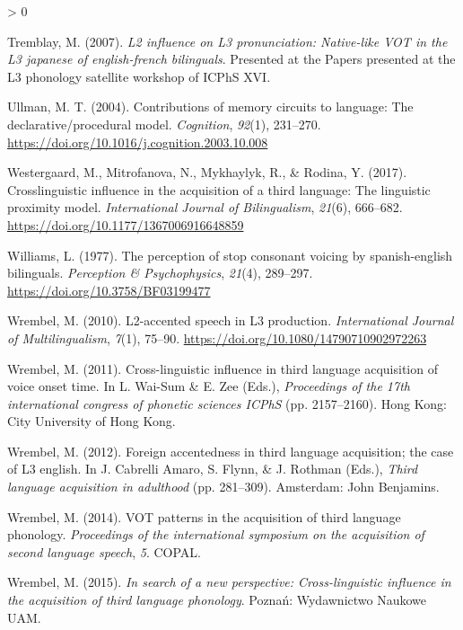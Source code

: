 \documentclass[
  english,
  man]{apa6}
\newlength{\cslhangindent}
\newenvironment{CSLReferences}[2] %
 {%
  \setlength{\parindent}{0pt}
  \ifodd #1 \everypar{\setlength{\hangindent}{\cslhangindent}}\ignorespaces\fi
  \ifnum #2 > 0
  \setlength{\parskip}{#2\baselineskip}
  \fi
 }%
 {}
\begin{document}
\begin{CSLReferences}{1}{0}
\leavevmode\hypertarget{ref-tremblay_l2_2007}{}%
Tremblay, M. (2007). \emph{L2 influence on L3 pronunciation: Native-like {VOT} in the L3 japanese of english-french bilinguals}. Presented at the Papers presented at the L3 phonology satellite workshop of {ICPhS} {XVI}.

\leavevmode\hypertarget{ref-ullman_contributions_2004}{}%
Ullman, M. T. (2004). Contributions of memory circuits to language: The declarative/procedural model. \emph{Cognition}, \emph{92}(1), 231--270. \url{https://doi.org/10.1016/j.cognition.2003.10.008}

\leavevmode\hypertarget{ref-westergaard_crosslinguistic_2017}{}%
Westergaard, M., Mitrofanova, N., Mykhaylyk, R., \& Rodina, Y. (2017). Crosslinguistic influence in the acquisition of a third language: The linguistic proximity model. \emph{International Journal of Bilingualism}, \emph{21}(6), 666--682. \url{https://doi.org/10.1177/1367006916648859}

\leavevmode\hypertarget{ref-williams_perception_1977}{}%
Williams, L. (1977). The perception of stop consonant voicing by spanish-english bilinguals. \emph{Perception \& Psychophysics}, \emph{21}(4), 289--297. \url{https://doi.org/10.3758/BF03199477}

\leavevmode\hypertarget{ref-wrembel_l2-accented_2010}{}%
Wrembel, M. (2010). L2-accented speech in L3 production. \emph{International Journal of Multilingualism}, \emph{7}(1), 75--90. \url{https://doi.org/10.1080/14790710902972263}

\leavevmode\hypertarget{ref-wrembel_cross-linguistic_2011}{}%
Wrembel, M. (2011). Cross-linguistic influence in third language acquisition of voice onset time. In L. Wai-Sum \& E. Zee (Eds.), \emph{Proceedings of the 17th international congress of phonetic sciences {ICPhS}} (pp. 2157--2160). Hong Kong: City University of Hong Kong.

\leavevmode\hypertarget{ref-wrembel_foreign_2012}{}%
Wrembel, M. (2012). Foreign accentedness in third language acquisition; the case of L3 english. In J. Cabrelli Amaro, S. Flynn, \& J. Rothman (Eds.), \emph{Third language acquisition in adulthood} (pp. 281--309). Amsterdam: John Benjamins.

\leavevmode\hypertarget{ref-wrembel_vot_2014}{}%
Wrembel, M. (2014). {VOT} patterns in the acquisition of third language phonology. \emph{Proceedings of the international symposium on the acquisition of second language speech}, \emph{5}. {COPAL}.

\leavevmode\hypertarget{ref-wrembel_search_2015}{}%
Wrembel, M. (2015). \emph{In search of a new perspective: Cross-linguistic influence in the acquisition of third language phonology}. Poznań: Wydawnictwo Naukowe {UAM}.


\end{CSLReferences}
\end{document}
